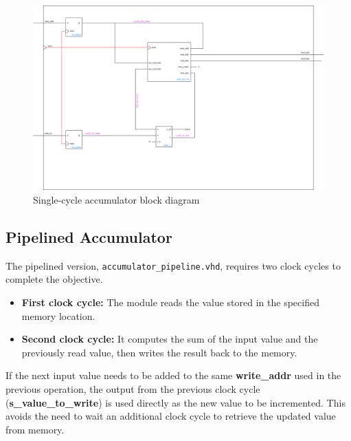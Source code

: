 \documentclass[a4paper,12pt]{article}
\begin{document}
\begin{figure}[H]
    \centering
    \includegraphics[width=1.0\linewidth]{accumulator_single_sycle.png}
    \caption{Single-cycle accumulator block diagram}
    \label{fig:single_cycle}
\end{figure}


\subsection{Pipelined Accumulator}
The pipelined version, \texttt{accumulator\_pipeline.vhd}, requires two clock cycles to complete the objective.
\begin{itemize}
    \item \textbf{First clock cycle:} The module reads the value stored in the specified memory location.
    \item \textbf{Second clock cycle:} It computes the sum of the input value and the previously read value, then writes the result back to the memory.
\end{itemize}
    

If the next input value needs to be added to the same \textbf{write\_addr} used in the previous operation, the output from the previous clock cycle (\textbf{s\_value\_to\_write}) is used directly as the new value to be incremented. This avoids the need to wait an additional clock cycle to retrieve the updated value from memory.
\end{document}
